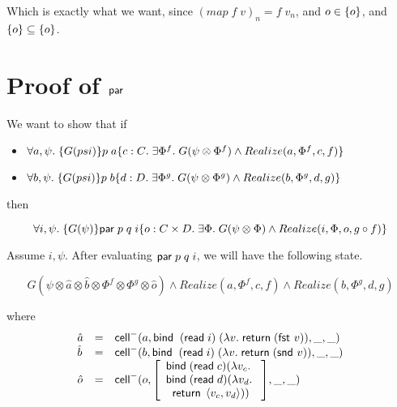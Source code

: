 \documentclass{article}
\begin{document}
Which is exactly what we want, since $(map\;f\;v)_n = f\;v_n$, and $o \in \{{o}\}$, and 
$\{{o}\} \subseteq \{{o}\}$. 

\section{Proof of $\mbox{\textsf{{par}}}\;$}

We want to show that if 

\begin{itemize}
\item $\forall a, \psi.\; \{{G(psi)}\}{p\;a}\{{c:C}.\;{\exists \Phi^f.\; G(\psi \otimes \Phi^f) \land
                                                   Realize(a, \Phi^f, c, f)}\}$ 
\item $\forall b, \psi.\; \{{G(psi)}\}{p\;b}\{{d:D}.\;{\exists \Phi^g.\; G(\psi \otimes \Phi^g) \land
                                                   Realize(b, \Phi^g, d, g)}\}$ 
\end{itemize}

then

\begin{displaymath}
  \forall i, \psi.\;\{{G(\psi)}\}{\mbox{\textsf{{par}}}\; p\;q\;i}\{{o:C\times D}.\;{\exists \Phi.\;
                                        G(\psi \otimes \Phi) \land 
                                        Realize(i, \Phi, o, g \circ f)}\}
\end{displaymath}

Assume $i, \psi$. After evaluating $\mbox{\textsf{{par}}}\; p\;q\;i$, we will have
the following state.
   
\begin{displaymath}
  G(\psi \otimes \hat{a} \otimes \hat{b} \otimes \Phi^f \otimes \Phi^g \otimes \hat{o})
  \land Realize(a, \Phi^f, c, f) \land Realize(b, \Phi^g, d, g)
\end{displaymath}

where 
\begin{displaymath}
  \begin{array}{lcl}
    \hat{a} & = & \mbox{\textsf{{cell}}}^{-}({a}, {\mbox{\textsf{{bind}}}\;\;(\mbox{\textsf{{read}}}\; i)\;(\lambda v.\;\mbox{\textsf{{return}}}\; (\mbox{\textsf{{fst }}} v))}, {\_}, {\_}) \\
    \hat{b} & = & \mbox{\textsf{{cell}}}^{-}({b}, {\mbox{\textsf{{bind}}}\;\;(\mbox{\textsf{{read}}}\; i)\;(\lambda v.\;\mbox{\textsf{{return}}}\; (\mbox{\textsf{{snd }}} v))}, {\_}, {\_}) \\
    \hat{o} & = & \mbox{\textsf{{cell}}}^{-}({o}, {\left[\begin{array}{l}
                               \mbox{\textsf{{bind}}}\; (\mbox{\textsf{{read}}}\; c) (\lambda v_c.\; \\
                               \mbox{\textsf{{bind}}}\; (\mbox{\textsf{{read}}}\; d) (\lambda v_d.\; \\
                               \;\;\mbox{\textsf{{return}}}\; \left<{v_c},{v_d}\right>)) \\
                              \end{array}\right]}, {\_}, {\_}) \\      
  \end{array}
\end{displaymath}
\end{document}

